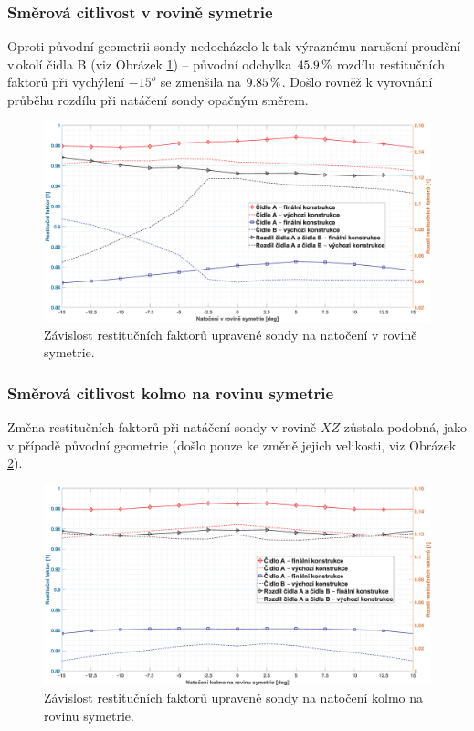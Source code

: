         \subsubsection{Směrová citlivost v rovině symetrie}
            Oproti původní geometrii sondy nedocházelo k tak výraznému narušení proudění v\,okolí čidla B (viz Obrázek \ref{fig:sonda-final-symetrie}) – původní odchylka $45.9 \, \%$ rozdílu restitučních faktorů při vychýlení $-15^o$ se zmenšila na $9.85 \, \%$. Došlo rovněž k vyrovnání průběhu rozdílu při natáčení sondy opačným směrem.
            \begin{figure}[ht!]
                \centering
                \includegraphics*[width=\textwidth]{500_FINAL/final_XY.eps}
                \caption{Závislost restitučních faktorů upravené sondy na natočení v rovině symetrie.}
                \label{fig:sonda-final-symetrie}
            \end{figure}
        \newpage

        \subsubsection{Směrová citlivost kolmo na rovinu symetrie}
            Změna restitučních faktorů při natáčení sondy v rovině $XZ$ zůstala podobná, jako v případě původní geometrie (došlo pouze ke změně jejich velikosti, viz Obrázek \ref{fig:sonda-final-kolma-rovina}).
            \begin{figure}[ht!]
                \centering
                \includegraphics*[width=\textwidth]{500_FINAL/final_XZ.eps}
                \caption{Závislost restitučních faktorů upravené sondy na natočení kolmo na rovinu symetrie.}
                \label{fig:sonda-final-kolma-rovina}
            \end{figure}

